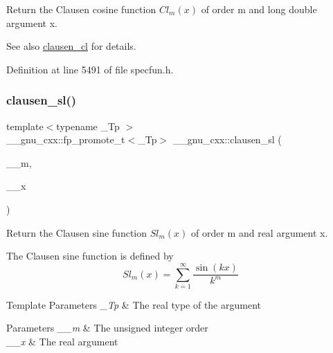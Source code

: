 Return the Clausen cosine function $ Cl_m(x) $ of order {\ttfamily m} and {\ttfamily long double} argument {\ttfamily x}.

\begin{DoxySeeAlso}{See also}
\hyperlink{group__mathsf__gnu_ga8786b86db309998f93f877cfb9bdfd57}{clausen\+\_\+cl} for details. 
\end{DoxySeeAlso}


Definition at line 5491 of file specfun.\+h.

\mbox{\label{group__mathsf__gnu_gacb757b00309213cd96bb2bc6b5dc3c24}} 
\subsubsection{\texorpdfstring{clausen\+\_\+sl()}{clausen\_sl()}}
{\footnotesize\ttfamily template$<$typename \+\_\+\+Tp $>$ \\
\+\_\+\+\_\+gnu\+\_\+cxx\+::fp\+\_\+promote\+\_\+t$<$\+\_\+\+Tp$>$ \+\_\+\+\_\+gnu\+\_\+cxx\+::clausen\+\_\+sl (\begin{DoxyParamCaption}\item[{unsigned int}]{\+\_\+\+\_\+m,  }\item[{\+\_\+\+Tp}]{\+\_\+\+\_\+x }\end{DoxyParamCaption})\hspace{0.3cm}{\ttfamily [inline]}}

Return the Clausen sine function $ Sl_m(x) $ of order {\ttfamily m} and real argument {\ttfamily x}.

The Clausen sine function is defined by \[ Sl_m(x) = \sum_{k=1}^\infty\frac{\sin(kx)}{k^m} \]


\begin{DoxyTemplParams}{Template Parameters}
{\em \+\_\+\+Tp} & The real type of the argument \\
\hline
\end{DoxyTemplParams}

\begin{DoxyParams}{Parameters}
{\em \+\_\+\+\_\+m} & The unsigned integer order \\
\hline
{\em \+\_\+\+\_\+x} & The real argument \\
\hline
\end{DoxyParams}



